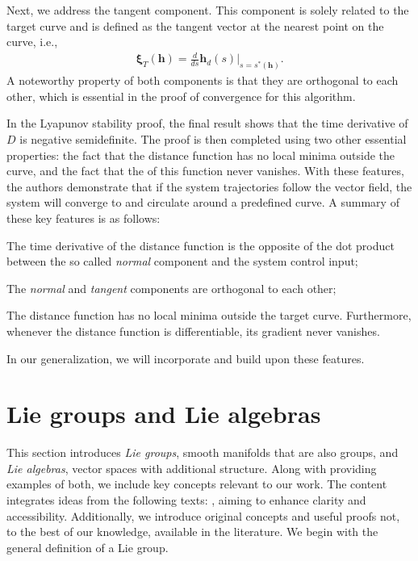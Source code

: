 Next, we address the tangent component. This component is solely related to the target curve and is defined as the tangent vector at the nearest point on the curve, i.e.,
\begin{align}
    \boldsymbol{\xi}_{T}(\mathbf{h}) = \frac{d}{ds}\mathbf{h}_d(s)|_{s=s^*(\mathbf{h})}.
\end{align}
A noteworthy property of both components is that they are orthogonal to each other, which is essential in the proof of convergence for this algorithm.

In the Lyapunov stability proof, the final result shows that the time derivative of $D$ is negative semidefinite. The proof is then completed using two other essential properties: the fact that the distance function has no local minima outside the curve, and the fact that the  of this function never vanishes. With these features, the authors demonstrate that if the system trajectories follow the vector field, the system will converge to and circulate around a predefined curve. A summary of these key features is as follows:
\begin{feature}
    \item The time derivative of the distance function is the opposite of the dot product between the so called \emph{normal} component and the system control input; \label{feat:adriano-time-derivative-lyapunov-normal-comp}
    \item The \emph{normal} and \emph{tangent} components are orthogonal to each other; \label{feat:adriano-orthogonality}
    \item The distance function has no local minima outside the target curve. Furthermore, whenever the distance function is differentiable, its gradient never vanishes. \label{feat:adriano-no-local-minima}
\end{feature}
In our generalization, we will incorporate and build upon these features.

\section{Lie groups and Lie algebras}\label{sec:background-lie-theory}
This section introduces \emph{Lie groups}, smooth manifolds that are also groups, and \emph{Lie algebras}, vector spaces with additional structure. Along with providing examples of both, we include key concepts relevant to our work. The content integrates ideas from the following texts: \citet{Lee2012,Gallier2020,Hall2015,Duistermaat2012}, aiming to enhance clarity and accessibility. Additionally, we introduce original concepts and useful proofs not, to the best of our knowledge, available in the literature. We begin with the general definition of a Lie group.
